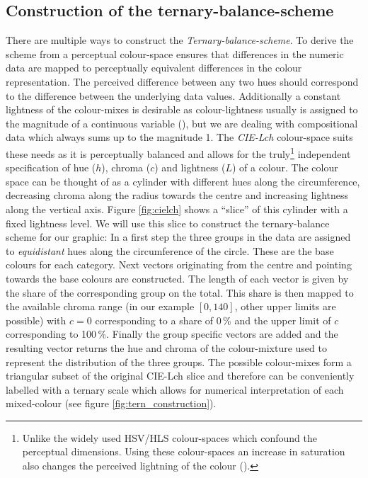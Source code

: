 \documentclass[a4paper]{scrartcl}
\begin{document}
\clearpage


\begin{appendix}

\section{Construction of the ternary-balance-scheme}

There are multiple ways to construct the \emph{Ternary-balance-scheme}. To derive the scheme from a perceptual colour-space ensures that differences in the numeric data are mapped to perceptually equivalent differences in the colour representation. The perceived difference between any two hues should correspond to the difference between the underlying data values. Additionally a constant lightness of the colour-mixes is desirable as colour-lightness usually is assigned to the magnitude of a continuous variable (\cite{Brewer1994}), but we are dealing with compositional data which always sums up to the magnitude 1. The \emph{CIE-Lch} colour-space suits these needs as it is perceptually balanced and allows for the truly\footnote{Unlike the widely used HSV/HLS colour-spaces which confound the perceptual dimensions. Using these colour-spaces an increase in saturation also changes the perceived lightning of the colour (\cite{Brewer1999}).} independent specification of hue ($h$), chroma ($c$) and lightness ($L$) of a colour. The colour space can be thought of as a cylinder with different hues along the circumference, decreasing chroma along the radius towards the centre and increasing lightness along the vertical axis. Figure \ref{fig:cielch} shows a \enquote{slice} of this cylinder with a fixed lightness level. We will use this slice to construct the ternary-balance scheme for our graphic: In a first step the three groups in the data are assigned to \emph{equidistant} hues along the circumference of the circle. These are the base colours for each category. Next vectors originating from the centre and pointing towards the base colours are constructed. The length of each vector is given by the share of the corresponding group on the total. This share is then mapped to the available chroma range (in our example $[0,140]$, other upper limits are possible) with $c = 0$ corresponding to a share of 0\,\% and the upper limit of $c$ corresponding to 100\,\%. Finally the group specific vectors are added and the resulting vector returns the hue and chroma of the colour-mixture used to represent the distribution of the three groups. The possible colour-mixes form a triangular subset of the original CIE-Lch slice and therefore can be conveniently labelled with a ternary scale which allows for numerical interpretation of each mixed-colour (see figure \ref{fig:tern_construction}).


\end{appendix}
\end{document}
